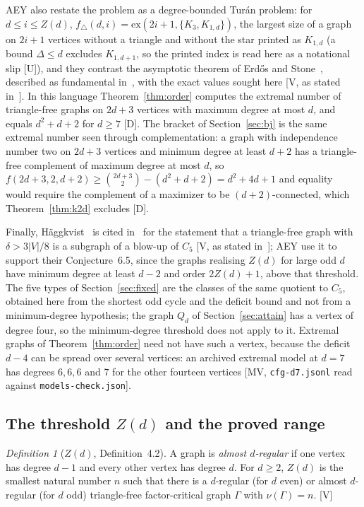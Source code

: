 \documentclass[11pt]{article}
\theoremstyle{remark}
\newtheorem{definition}[theorem]{Definition}
\begin{document}
AEY also restate the problem as a degree-bounded Tur\'an problem: for $d\le i\le Z(d)$, $f_\triangle(d,i)=\mathrm{ex}(2i+1,\{K_3,K_{1,d}\})$, the largest size of a graph on $2i+1$ vertices without a triangle and without the star printed as $K_{1,d}$ (a bound $\Delta\le d$ excludes $K_{1,d+1}$, so the printed index is read here as a notational slip [U]), and they contrast the asymptotic theorem of Erd\H{o}s and Stone~\cite{ErdosStone}, described as fundamental in~\cite{Bollobas}, with the exact values sought here [V, as stated in~\cite{AEY}]. In this language Theorem~\ref{thm:order} computes the extremal number of triangle-free graphs on $2d+3$ vertices with maximum degree at most $d$, and equals $d^2+d+2$ for $d\ge7$ [D]. The bracket of Section~\ref{sec:bj} is the same extremal number seen through complementation: a graph with independence number two on $2d+3$ vertices and minimum degree at least $d+2$ has a triangle-free complement of maximum degree at most $d$, so $f(2d+3,2,d+2)\ge\binom{2d+3}{2}-(d^2+d+2)=d^2+4d+1$ and equality would require the complement of a maximizer to be $(d+2)$-connected, which Theorem~\ref{thm:k2d} excludes [D].

Finally, H\"aggkvist~\cite{Haggkvist} is cited in~\cite{AEY} for the statement that a triangle-free graph with $\delta>3|V|/8$ is a subgraph of a blow-up of $C_5$ [V, as stated in~\cite{AEY}]; AEY use it to support their Conjecture~6.5, since the graphs realising $Z(d)$ for large odd $d$ have minimum degree at least $d-2$ and order $2Z(d)+1$, above that threshold. The five types of Section~\ref{sec:fixed} are the classes of the same quotient to $C_5$, obtained here from the shortest odd cycle and the deficit bound and not from a minimum-degree hypothesis; the graph $Q_d$ of Section~\ref{sec:attain} has a vertex of degree four, so the minimum-degree threshold does not apply to it. Extremal graphs of Theorem~\ref{thm:order} need not have such a vertex, because the deficit $d-4$ can be spread over several vertices: an archived extremal model at $d=7$ has degrees $6,6,6$ and $7$ for the other fourteen vertices [MV, \texttt{cfg-d7.jsonl} read against \texttt{models-check.json}].

\subsection{The threshold \texorpdfstring{$Z(d)$}{Z(d)} and the proved range}\label{sec:Z}

\begin{definition}[$Z(d)$, \cite{AEY} Definition~4.2]\label{def:Z}
A graph is \emph{almost $d$-regular} if one vertex has degree $d-1$ and every other vertex has degree $d$. For $d\ge2$, $Z(d)$ is the smallest natural number $n$ such that there is a $d$-regular (for $d$ even) or almost $d$-regular (for $d$ odd) triangle-free factor-critical graph $\Gamma$ with $\nu(\Gamma)=n$. [V]
\end{definition}
\end{document}
